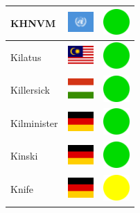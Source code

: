 \documentclass[12pt, a4paper, twoside]{report}
\begin{document}
\begin{center}
\begin{longtable}{|p{5cm}|p{2cm}|p{2cm}|}
 KHNVM                                                      & \includegraphics[width=1cm]{../img/flags/un} &   \includegraphics[width=1cm]{../likes/y} \\ \hline
 Kilatus                                                    & \includegraphics[width=1cm]{../img/flags/my} &   \includegraphics[width=1cm]{../likes/y} \\ \hline
 Killersick                                                 & \includegraphics[width=1cm]{../img/flags/hu} &   \includegraphics[width=1cm]{../likes/y} \\ \hline
 Kilminister                                                & \includegraphics[width=1cm]{../img/flags/de} &   \includegraphics[width=1cm]{../likes/y} \\ \hline
 Kinski                                                     & \includegraphics[width=1cm]{../img/flags/de} &   \includegraphics[width=1cm]{../likes/y} \\ \hline
 Knife                                                      & \includegraphics[width=1cm]{../img/flags/de} &   \includegraphics[width=1cm]{../likes/m} \\ \hline

\end{longtable}
\end{center}
\end{document}
